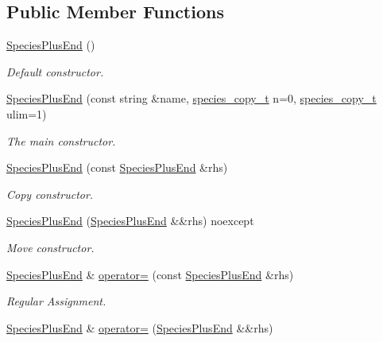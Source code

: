 \subsection*{Public Member Functions}
\begin{DoxyCompactItemize}
\item 
\hyperlink{classSpeciesPlusEnd_a940477fe241c4e36a13d42a479c788d6}{Species\+Plus\+End} ()
\begin{DoxyCompactList}\small\item\em Default constructor. \end{DoxyCompactList}\item 
\hyperlink{classSpeciesPlusEnd_ab36e50cc010eccade0ef3f2223727644}{Species\+Plus\+End} (const string \&name, \hyperlink{common_8h_a3503f321fd36304ee274141275cca586}{species\+\_\+copy\+\_\+t} n=0, \hyperlink{common_8h_a3503f321fd36304ee274141275cca586}{species\+\_\+copy\+\_\+t} ulim=1)
\begin{DoxyCompactList}\small\item\em The main constructor. \end{DoxyCompactList}\item 
\hyperlink{classSpeciesPlusEnd_a353b33c1e93acf5254e761eb0045c3a0}{Species\+Plus\+End} (const \hyperlink{classSpeciesPlusEnd}{Species\+Plus\+End} \&rhs)
\begin{DoxyCompactList}\small\item\em Copy constructor. \end{DoxyCompactList}\item 
\hyperlink{classSpeciesPlusEnd_ae83c7bb9f800dc394a6e5038f1e043f1}{Species\+Plus\+End} (\hyperlink{classSpeciesPlusEnd}{Species\+Plus\+End} \&\&rhs) noexcept
\begin{DoxyCompactList}\small\item\em Move constructor. \end{DoxyCompactList}\item 
\hyperlink{classSpeciesPlusEnd}{Species\+Plus\+End} \& \hyperlink{classSpeciesPlusEnd_a5f0bc88dba1a97d30d54c0b37e349ec7}{operator=} (const \hyperlink{classSpeciesPlusEnd}{Species\+Plus\+End} \&rhs)
\begin{DoxyCompactList}\small\item\em Regular Assignment. \end{DoxyCompactList}\item 
\hyperlink{classSpeciesPlusEnd}{Species\+Plus\+End} \& \hyperlink{classSpeciesPlusEnd_a1ef2d1e906f0470eb62465d574e0491f}{operator=} (\hyperlink{classSpeciesPlusEnd}{Species\+Plus\+End} \&\&rhs)

\end{DoxyCompactItemize}
